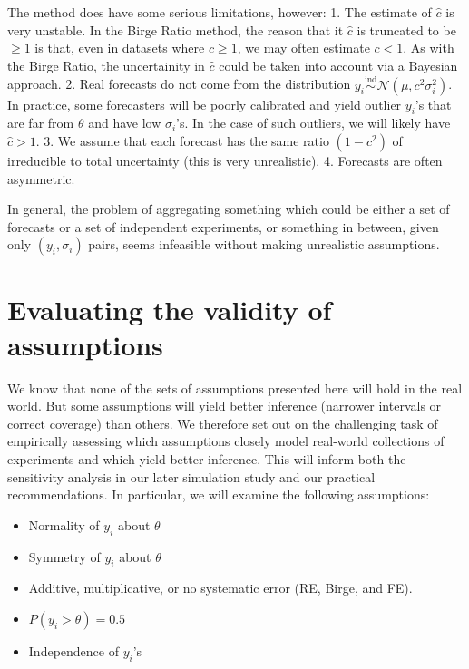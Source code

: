 \documentclass[12pt]{article}
\begin{document}
The method does have some serious limitations, however:
1. The estimate of $\hat c$ is very unstable. In the Birge Ratio method, the reason that it $\hat c$ is truncated to be $\geq1$ is that, even in datasets where $c\geq 1$, we may often estimate $c<1$. As with the Birge Ratio, the uncertainity in $\hat c$ could be taken into account via a Bayesian approach.
2. Real forecasts do not come from the distribution $y_i\overset{\mathrm{ind}}{\sim}\mathcal{N}(\mu,c^2\sigma_i^2)$. In practice, some forecasters will be poorly calibrated and yield outlier $y_i$'s that are far from $\theta$ and have low $\sigma_i$'s. In the case of such outliers, we will likely have $\hat c>1$.
3. We assume that each forecast has the same ratio $(1-c^2)$ of irreducible to total uncertainty (this is very unrealistic).
4. Forecasts are often asymmetric.

In general, the problem of aggregating something which could be either a set of forecasts or a set of independent experiments, or something in between, given only $(y_i,\sigma_i)$ pairs, seems infeasible without making unrealistic assumptions.

\section{Evaluating the validity of assumptions}\label{evaluating-the-validity-of-assumptions}

We know that none of the sets of assumptions presented here will hold in the real world. But some assumptions will yield better inference (narrower intervals or correct coverage) than others. We therefore set out on the challenging task of empirically assessing which assumptions closely model real-world collections of experiments and which yield better inference. This will inform both the sensitivity analysis in our later simulation study and our practical recommendations. In particular, we will examine the following assumptions:

\begin{itemize}

\item
  Normality of $y_i$ about $\theta$
\item
  Symmetry of $y_i$ about $\theta$
\item
  Additive, multiplicative, or no systematic error (RE, Birge, and FE).
\item
  $P(y_i>\theta)=0.5$
\item
  Independence of $y_i$'s
\end{itemize}
\end{document}
